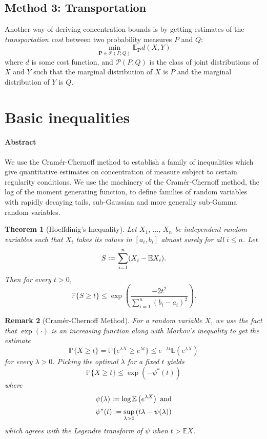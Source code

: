 \documentclass{amsproc}
\newtheorem{theorem}{Theorem}
\newtheorem{remark}[theorem]{Remark}
\newcommand{\defeq}{\vcentcolon=} %
\renewcommand{\P}{\mathbb{P}} %
\newcommand{\E}{\mathbb{E}} %
\begin{document}
\subsection*{Method 3: Transportation}
\label{sec:transport_method}
	Another way of deriving concentration bounds is by getting estimates of the \textit{transportation cost} between two probability measures $P$ and $Q$:
	\[
		\min_{\mathbf{P}\in\mathcal{P}(P,Q)} \E_\mathbf{P}d(X,Y)
	\]
	where $d$ is some cost function, and $\mathcal{P}(P,Q)$ is the class of joint distributions of $X$ and $Y$ such that the marginal distribution of $X$ is $P$ and the marginal distribution of $Y$ is $Q$.


\section{Basic inequalities}
\label{sec:basic_inequalites}
\paragraph{\textbf{Abstract}}
	We use the Cram\'{e}r-Chernoff method to establish a family of inequalities which give quantitative estimates on concentration of measure subject to certain regularity conditions. We use the machinery of the Cram\'{e}r-Chernoff method, the log of the moment generating function, to define families of random variables with rapidly decaying tails, sub-Gaussian and more generally sub-Gamma random variables.

\begin{theorem}[Hoeffdinig's Inequality]
\label{thm:hoeffding}
	Let $X_1,\, \dots,\, X_n$ be independent random variables such that $X_i$ takes its values in $[a_i, b_i]$ almost surely for all $i \leq n$. Let
	\[S \defeq \sum_{i=1}^n (X_i - \E X_i).\]
	Then for every $t > 0$,
	\[\P \{S \geq t \} \leq  \exp \left( \frac{-2t^2}{\sum_{i=1}^n (b_i-a_i)^2} \right).\]
\end{theorem}

\begin{remark}[Cram\'{e}r-Chernoff Method]
\label{rmk:cramer_chernoff}
	For a random variable $X$, we use the fact that $\exp(\cdot)$ is an increasing function along with Markov's inequality to get the estimate
	\[\P \{X \geq t \} = \P \{e^{\lambda X} \geq e^{\lambda t} \} \leq e^{-\lambda t} \E \left( e^{\lambda X} \right)\]
	for every $\lambda > 0$.
	Picking the optimal $\lambda$ for a fixed $t$ yields
	\[\P \{X \geq t \} \leq \exp \left( -\psi^*(t) \right) \]
	where 
	\[\psi(\lambda) \defeq \log \E \left( e^{\lambda X} \right) \text{ and}\]
	\[\psi^*(t) \defeq \sup_{\lambda > 0} \left( t \lambda - \psi(\lambda) \right) \]
	which agrees with the Legendre transform of $\psi$ when $t > \E X$.
\end{remark}
\end{document}
